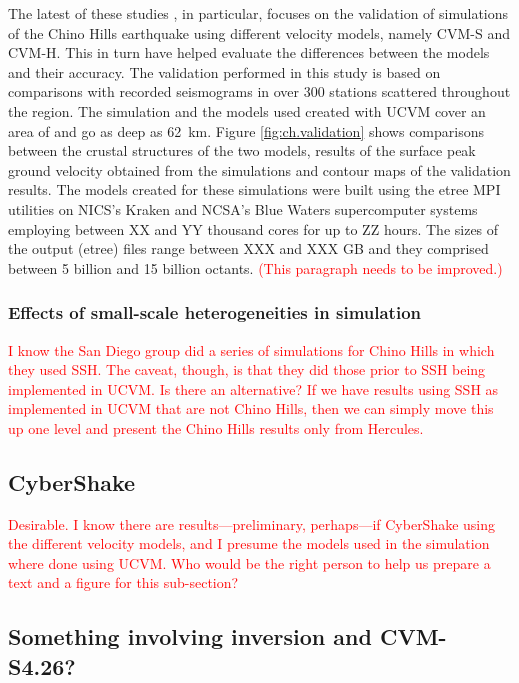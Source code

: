 The latest of these studies \citep{Taborda_2014_BSSA}, in particular, focuses on the validation of simulations of the Chino Hills earthquake using different velocity models, namely CVM-S and CVM-H. This in turn have helped evaluate the differences between the models and their accuracy. The validation performed in this study is based on comparisons with recorded seismograms in over 300 stations scattered throughout the region. The simulation and the models used created with UCVM cover an area of  and go as deep as 62~km. Figure \ref{fig:ch.validation} shows comparisons between the crustal structures of the two models, results of the surface peak ground velocity obtained from the simulations and contour maps of the validation results. The models created for these simulations were built using the etree MPI utilities on NICS's Kraken and NCSA's Blue Waters supercomputer systems employing between XX and YY thousand cores for up to ZZ hours. The sizes of the output (etree) files range between XXX and XXX GB and they comprised between 5 billion and 15 billion octants. \textcolor{red}{(This paragraph needs to be improved.)}



\subsubsection{Effects of small-scale heterogeneities in simulation}
\label{sec:ch-ssh}

\textcolor{red}{I know the San Diego group did a series of simulations for Chino Hills in which they used SSH.  The caveat, though, is that they did those prior to SSH being implemented in UCVM.  Is there an alternative? If we have results using SSH as implemented in UCVM that are not Chino Hills, then we can simply move this up one level and present the Chino Hills results only from Hercules.}

\subsection{CyberShake}

\textcolor{red}{Desirable. I know there are results---preliminary, perhaps---if CyberShake using the different velocity models, and I presume the models used in the simulation where done using UCVM. Who would be the right person to help us prepare a text and a figure for this sub-section?}

\subsection{Something involving inversion and CVM-S4.26?}

